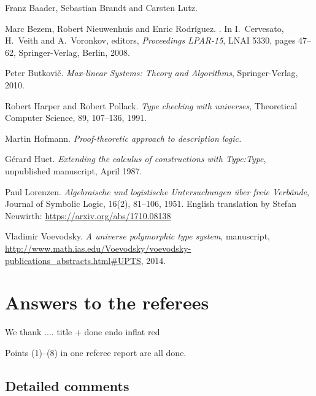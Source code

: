 \documentclass[11pt,a4paper]{article}
\begin{document}


\begin{thebibliography}{99}

  Franz Baader, Sebastian Brandt and Carsten Lutz.

Marc Bezem, Robert Nieuwenhuis and Enric Rodr\'iguez.
.
In I.~Cervesato, H.~Veith and A.~Voronkov, editors,
\emph{Proceedings LPAR-15}, LNAI 5330,
pages 47--62, Springer-Verlag, Berlin, 2008.

Peter Butkovi\v{c}.
\newblock\emph{Max-linear Systems: Theory and Algorithms},
Springer-Verlag, 2010.

Robert Harper and Robert Pollack.
\newblock\emph{Type checking with universes},
Theoretical Computer Science, 89, 107--136, 1991.

  Martin Hofmann.
  \newblock\emph{Proof-theoretic approach to description logic.}

G\'erard Huet.
\newblock\emph{Extending the calculus of constructions with {Type:Type}},
\newblock unpublished manuscript, April 1987.

Paul Lorenzen.
  \newblock\emph{Algebraische und logistische Untersuchungen über freie Verbände},
Journal of Symbolic Logic, 16(2), 81--106, 1951.
English translation by Stefan Neuwirth: \url{https://arxiv.org/abs/1710.08138}

  Vladimir Voevodsky.
 \newblock\emph{A universe polymorphic type system},
manuscript, 
 \newblock \url{http://www.math.ias.edu/Voevodsky/voevodsky-publications_abstracts.html\#UPTS}, {2014}.



\end{thebibliography}

\newpage

\section*{Answers to the referees}

We thank ....
title + done 
endo inflat
red

Points (1)--(8) in one referee report are all done.

\subsection*{Detailed comments}
\end{document}
